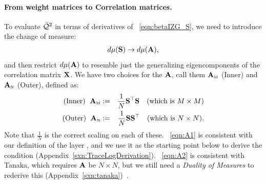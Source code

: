 \paragraph{From weight matrices to Correlation matrices.}
To evaluate $\bar{\mathcal{Q}}^{2}$ in terms of derivatives of \EQN~\ref{eqn:betaIZG_S}, we need to introduce the change of measure:
\begin{align}
  \label{eqn:changeOfMeasure}
  d\mu({\mathbf{S}})\rightarrow d\mu(\mathbf{A}) ,
\end{align}
and then restrict $d\mu(\mathbf{A})$ to resemble just the generalizing eigencomponents of the \Teacher correlation matrix $\mathbf{X}$.
%
We have two choices for the \Student \CorrelationMatrix $\mathbf{A}$, call them ${\mathbf{A}}_{\text{\tiny M}}$
(Inner) and ${\mathbf{A}}_{\text{\tiny N}}$ (Outer), defined as:
\begin{eqnarray}
  \label{eqn:A1}
 \textrm{(Inner) }\;{\mathbf{A}}_{\text{\tiny M}}&:=& \frac{1}{N}{\mathbf{S}}^{\top}{\mathbf{S}} \quad\mbox{(which is $M \times M$)} \\
  \label{eqn:A2}
 \textrm{(Outer) }\;{\mathbf{A}}_{\text{\tiny N}} &:=& \frac{1}{N}{\mathbf{S}}{\mathbf{S}}^{\top} \quad\mbox{(which is $N \times N$)} .
\end{eqnarray}
Note that $\frac{1}{N}$ is the correct scaling on each of these.
\EQN~\ref{eqn:A1} is consistent with our definition of the layer \CorrelationMatrix, and we use it as the starting point
below to derive the \VolumePreserving \TRACELOG condition (Appendix~\ref{sxn:TraceLogDerivation}).
\EQN~\ref{eqn:A2} is consistent with Tanaka, which requires $\mathbf{A}$ be $N\times N$, but
we still need a \emph{Duality of Measures} to rederive this (Appendix~\ref{sxn:tanaka})~\cite{Tanaka2007, Tanaka2008}.

